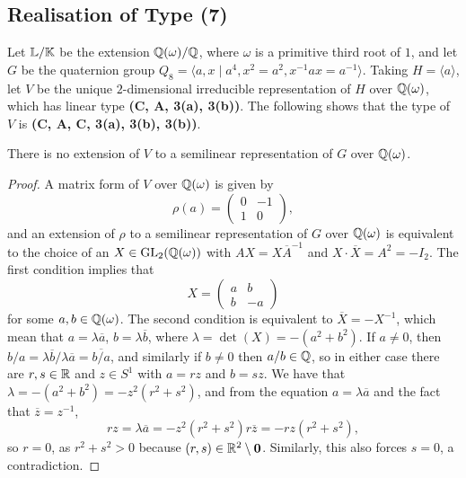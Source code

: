 \subsection{Realisation of Type (7)}

Let ${\mathbb L} / {\mathbb K}$ be the extension ${\mathbb Q}(\omega) / {\mathbb Q}$, where $\omega$ is a primitive third root of $1$, and let $G$ be the quaternion group $Q_8 = \langle a,x \mid a^4, x^2 = a^2, x^{-1}ax = a^{-1} \rangle$. Taking $H = \langle a \rangle$, let $V$ be the unique $2$-dimensional irreducible representation of $H$ over ${\mathbb Q}(\omega)$, which has linear type \textbf{(C, A, 3(a), 3(b))}. The following shows that the type of $V$ is \textbf{(C, A, C, 3(a), 3(b), 3(b))}. 

\begin{lemma}
    There is no extension of $V$ to a semilinear representation of $G$ over ${\mathbb Q}(\omega)$.
\end{lemma}

\begin{proof}
A matrix form of $V$ over ${\mathbb Q}(\omega)$ is given by 
\[
\rho(a) = \begin{pmatrix}
    0 & -1 \\ 1 & 0
\end{pmatrix},
\]
and an extension of $\rho$ to a semilinear representation of $G$ over ${\mathbb Q}(\omega)$ is equivalent to the choice of an $X \in \operatorname{GL}_2({\mathbb Q}(\omega))$ with $A X = X \overline{A}^{-1}$ and $X \cdot \overline{X} = A^2 = -I_2$. The first condition implies that
\[
X = \begin{pmatrix}
    a & b \\ b & -a
\end{pmatrix}
\]
for some $a , b \in {\mathbb Q}(\omega)$. The second condition is equivalent to $\overline{X} = - X^{-1}$, which mean that $a = \lambda \overline{a}$, $b = \lambda \overline{b}$, where $\lambda = \det(X) = - (a^2 + b^2)$. If $a \neq 0$, then $b/a = \lambda \overline{b} / \lambda \overline{a} = \overline{b/a}$, and similarly if $b \neq 0$ then $a/b \in {\mathbb Q}$, so in either case there are $r,s \in {\mathbb R}$ and $z \in S^1$ with $a = rz$ and $b = sz$. We have that $\lambda = -(a^2 + b^2) = - z^2 (r^2 + s^2)$, and from the equation $a = \lambda \overline{a}$ and the fact that $\overline{z} = z^{-1}$,
\[
r z = \lambda \overline{a} = - z^2 (r^2 + s^2) r \overline{z} = - r z (r^2 + s^2),
\]
so $r = 0$, as $r^2 + s^2 > 0$ because $(r,s) \in {\mathbb R}^2 \setminus \mathbf{0}$. Similarly, this also forces $s = 0$, a contradiction.
\end{proof}

